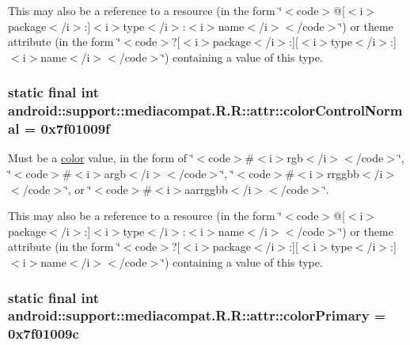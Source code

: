 This may also be a reference to a resource (in the form \char`\"{}$<$code$>$@\mbox{[}$<$i$>$package$<$/i$>$:\mbox{]}$<$i$>$type$<$/i$>$:$<$i$>$name$<$/i$>$$<$/code$>$\char`\"{}) or theme attribute (in the form \char`\"{}$<$code$>$?\mbox{[}$<$i$>$package$<$/i$>$:\mbox{]}\mbox{[}$<$i$>$type$<$/i$>$:\mbox{]}$<$i$>$name$<$/i$>$$<$/code$>$\char`\"{}) containing a value of this type. \hypertarget{classandroid_1_1support_1_1mediacompat_1_1_r_1_1attr_66ee2a0f2b08d6257def2d5d777e1d97}{
\subsubsection[{colorControlNormal}]{\setlength{\rightskip}{0pt plus 5cm}static final int android::support::mediacompat.R.R::attr::colorControlNormal = 0x7f01009f}}
\label{classandroid_1_1support_1_1mediacompat_1_1_r_1_1attr_66ee2a0f2b08d6257def2d5d777e1d97}


Must be a \hyperlink{classandroid_1_1support_1_1mediacompat_1_1_r_1_1color}{color} value, in the form of \char`\"{}$<$code$>$\#$<$i$>$rgb$<$/i$>$$<$/code$>$\char`\"{}, \char`\"{}$<$code$>$\#$<$i$>$argb$<$/i$>$$<$/code$>$\char`\"{}, \char`\"{}$<$code$>$\#$<$i$>$rrggbb$<$/i$>$$<$/code$>$\char`\"{}, or \char`\"{}$<$code$>$\#$<$i$>$aarrggbb$<$/i$>$$<$/code$>$\char`\"{}. 

This may also be a reference to a resource (in the form \char`\"{}$<$code$>$@\mbox{[}$<$i$>$package$<$/i$>$:\mbox{]}$<$i$>$type$<$/i$>$:$<$i$>$name$<$/i$>$$<$/code$>$\char`\"{}) or theme attribute (in the form \char`\"{}$<$code$>$?\mbox{[}$<$i$>$package$<$/i$>$:\mbox{]}\mbox{[}$<$i$>$type$<$/i$>$:\mbox{]}$<$i$>$name$<$/i$>$$<$/code$>$\char`\"{}) containing a value of this type. \hypertarget{classandroid_1_1support_1_1mediacompat_1_1_r_1_1attr_c5b65403dfab483c842d288f9f117e9c}{
\subsubsection[{colorPrimary}]{\setlength{\rightskip}{0pt plus 5cm}static final int android::support::mediacompat.R.R::attr::colorPrimary = 0x7f01009c}}
\label{classandroid_1_1support_1_1mediacompat_1_1_r_1_1attr_c5b65403dfab483c842d288f9f117e9c}



